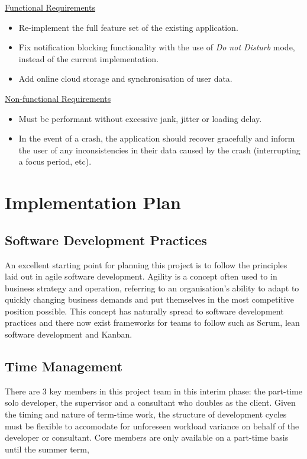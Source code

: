 \underline{Functional Requirements}
\begin{itemize}
    \item Re-implement the full feature set of the existing application.
    \item Fix notification blocking functionality with the use of \textit{Do not Disturb} mode, instead of the current implementation.
    \item Add online cloud storage and synchronisation of user data.
\end{itemize}

\underline{Non-functional Requirements}
\begin{itemize}
    \item Must be performant without excessive jank, jitter or loading delay.
    \item In the event of a crash, the application should recover gracefully and inform the user of any inconsistencies in their data caused by the crash (interrupting a focus period, etc).
\end{itemize}


\section{Implementation Plan}
\subsection{Software Development Practices}
An excellent starting point for planning this project is to follow the principles laid out in agile software development. Agility is a concept often used to in business strategy and operation, referring to an organisation's ability to adapt to quickly changing business demands and put themselves in the most competitive position possible. This concept has naturally spread to software development practices and there now exist frameworks for teams to follow such as Scrum, lean software development and Kanban.



\subsection{Time Management}
There are 3 key members in this project team in this interim phase: the part-time solo developer, the supervisor and a consultant who doubles as the client. Given the timing and nature of term-time work, the structure of development cycles must be flexible to accomodate for unforeseen workload variance on behalf of the developer or consultant. Core members are only available on a part-time basis until the summer term,

